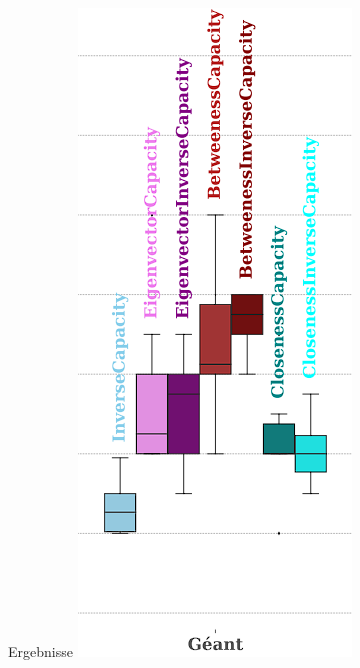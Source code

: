 \documentclass[aspectratio=169,10pt]{beamer}
\begin{document}
\begin{frame}[fragile]{Ergebnisse}
\includegraphics[width=.4\textwidth, angle=270]{images/kai_8.png}
\end{frame}
\end{document}
